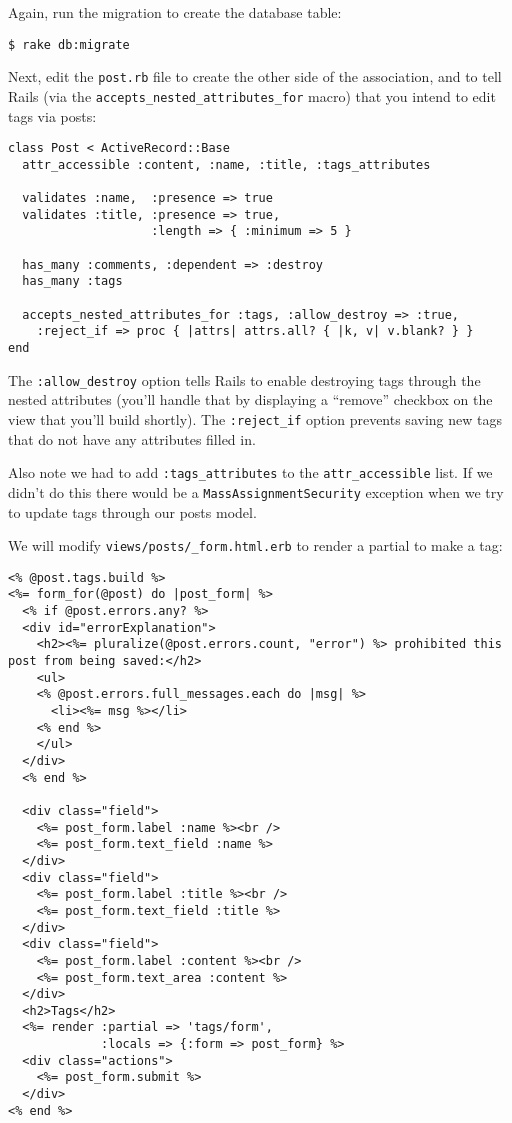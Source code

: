 \documentclass[10pt]{book}
\begin{document}
Again, run the migration to create the database table:


\begin{verbatim}
$ rake db:migrate
\end{verbatim}

Next, edit the \texttt{post.rb} file to create the other side of the association, and to tell Rails (via the \texttt{accepts\_nested\_attributes\_for} macro) that you intend to edit tags via posts:


\begin{verbatim}
class Post < ActiveRecord::Base
  attr_accessible :content, :name, :title, :tags_attributes
 
  validates :name,  :presence => true
  validates :title, :presence => true,
                    :length => { :minimum => 5 }
 
  has_many :comments, :dependent => :destroy
  has_many :tags
 
  accepts_nested_attributes_for :tags, :allow_destroy => :true,
    :reject_if => proc { |attrs| attrs.all? { |k, v| v.blank? } }
end
\end{verbatim}

The \texttt{:allow\_destroy} option tells Rails to enable destroying tags through the nested attributes (you’ll handle that by displaying a “remove” checkbox on the view that you’ll build shortly). The \texttt{:reject\_if} option prevents saving new tags that do not have any attributes filled in.

Also note we had to add \texttt{:tags\_attributes} to the \texttt{attr\_accessible} list. If we didn’t do this there would be a \texttt{MassAssignmentSecurity} exception when we try to update tags through our posts model.

We will modify \texttt{views/posts/\_form.html.erb} to render a partial to make a tag:

\begin{minipage}{\textwidth}
\begin{verbatim}
<% @post.tags.build %>
<%= form_for(@post) do |post_form| %>
  <% if @post.errors.any? %>
  <div id="errorExplanation">
    <h2><%= pluralize(@post.errors.count, "error") %> prohibited this post from being saved:</h2>
    <ul>
    <% @post.errors.full_messages.each do |msg| %>
      <li><%= msg %></li>
    <% end %>
    </ul>
  </div>
  <% end %>
 
  <div class="field">
    <%= post_form.label :name %><br />
    <%= post_form.text_field :name %>
  </div>
  <div class="field">
    <%= post_form.label :title %><br />
    <%= post_form.text_field :title %>
  </div>
  <div class="field">
    <%= post_form.label :content %><br />
    <%= post_form.text_area :content %>
  </div>
  <h2>Tags</h2>
  <%= render :partial => 'tags/form',
             :locals => {:form => post_form} %>
  <div class="actions">
    <%= post_form.submit %>
  </div>
<% end %>
\end{verbatim}
\end{minipage}
\\ \\
\end{document}
